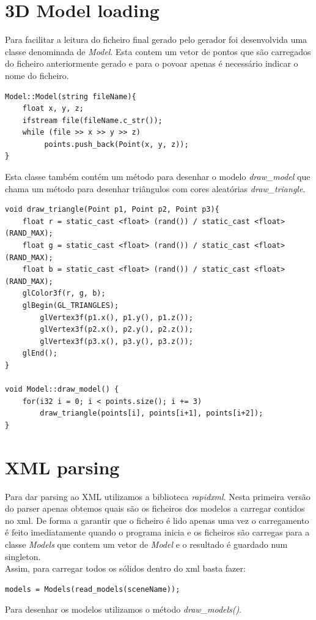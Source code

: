 \documentclass[a4paper]{report}
\begin{document}
\section{3D Model loading}
Para facilitar a leitura do ficheiro final gerado pelo gerador foi desenvolvida
uma classe denominada de \textit{Model}. Esta contem um vetor de pontos que são
carregados do ficheiro anteriormente gerado e para o povoar apenas é necessário
indicar o nome do ficheiro.\\
\begin{lstlisting}
Model::Model(string fileName){
    float x, y, z;
    ifstream file(fileName.c_str());
    while (file >> x >> y >> z)
         points.push_back(Point(x, y, z));
}
\end{lstlisting}
Esta classe também contém um método para desenhar o modelo \textit{draw\_model} que chama um método
para desenhar triângulos com cores aleatórias \textit{draw\_triangle}.
\begin{lstlisting}
void draw_triangle(Point p1, Point p2, Point p3){
    float r = static_cast <float> (rand()) / static_cast <float> (RAND_MAX);
    float g = static_cast <float> (rand()) / static_cast <float> (RAND_MAX);
    float b = static_cast <float> (rand()) / static_cast <float> (RAND_MAX);
    glColor3f(r, g, b);
    glBegin(GL_TRIANGLES);
        glVertex3f(p1.x(), p1.y(), p1.z());
        glVertex3f(p2.x(), p2.y(), p2.z());
        glVertex3f(p3.x(), p3.y(), p3.z());
    glEnd();
}

void Model::draw_model() {
    for(i32 i = 0; i < points.size(); i += 3)
        draw_triangle(points[i], points[i+1], points[i+2]);
}
\end{lstlisting}

\section{XML parsing}
Para dar parsing ao XML utilizamos a biblioteca \textit{rapidxml}. Nesta
primeira versão do parser apenas obtemos quais são os ficheiros dos modelos a
carregar contidos no xml. De forma a garantir que o ficheiro é lido apenas uma
vez o carregamento é feito imediatamente quando o programa inicia e os ficheiros
são carregas para a classe \textit{Models} que contem um vetor de \textit{Model}
e o resultado é guardado num singleton.\\
Assim, para carregar todos os sólidos dentro do xml basta fazer:
\begin{lstlisting}
models = Models(read_models(sceneName));
\end{lstlisting}
Para desenhar os modelos utilizamos o método \textit{draw\_models()}.
\end{document}
